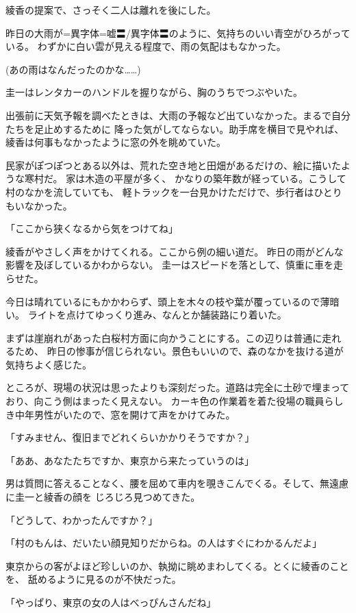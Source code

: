 ﻿\documentclass[
    book,tate,
    line_length=30zw,
    jafontsize=12pt,
    paper=b5j,
    landscape,
    ]{jlreq}
\begin{document}
綾香の提案で、さっそく二人は離れを後にした。

昨日の大雨が=異字体=嘘〓/異字体〓のように、気持ちのいい青空がひろがっている。
わずかに白い雲が見える程度で、雨の気配はもなかった。

(あの雨はなんだったのかな……)

圭一はレンタカーのハンドルを握りながら、胸のうちでつぶやいた。

出張前に天気予報を調べたときは、大雨の予報など出ていなかった。まるで自分たちを足止めするために
降った気がしてならない。助手席を横目で見やれば、綾香は何事もなかったように窓の外を眺めていた。

民家がぽつぽつとある以外は、荒れた空き地と田畑があるだけの、絵に描いたような寒村だ。
家は木造の平屋が多く、 かなりの築年数が経っている。こうして村のなかを流していても、
軽トラックを一台見かけただけで、歩行者はひとりもいなかった。

「ここから狭くなるから気をつけてね」

綾香がやさしく声をかけてくれる。ここから例の細い道だ。 昨日の雨がどんな影響を及ぼしているかわからない。
圭一はスピードを落として、慎重に車を走らせた。

今日は晴れているにもかかわらず、頭上を木々の枝や葉が覆っているので薄暗い。
ライトを点けてゆっくり進み、なんとか舗装路にり着いた。

まずは崖崩れがあった白桜村方面に向かうことにする。この辺りは普通に走れるため、
昨日の惨事が信じられない。景色もいいので、森のなかを抜ける道が気持ちよく感じた。

ところが、現場の状況は思ったよりも深刻だった。道路は完全に土砂で埋まっており、向こう側はまったく見えない。
カーキ色の作業着を着た役場の職員らしき中年男性がいたので、窓を開けて声をかけてみた。

「すみません、復旧までどれくらいかかりそうですか？」

「ああ、あなたたちですか、東京から来たっていうのは」

男は質問に答えることなく、腰を屈めて車内を覗きこんでくる。そして、無遠慮に圭一と綾香の顔を
じろじろ見つめてきた。

「どうして、わかったんですか？」

「村のもんは、だいたい顔見知りだからね。の人はすぐにわかるんだよ」

東京からの客がよほど珍しいのか、執拗に眺めまわしてくる。とくに綾香のことを、
舐めるように見るのが不快だった。

「やっぱり、東京の女の人はべっぴんさんだね」
\end{document}
